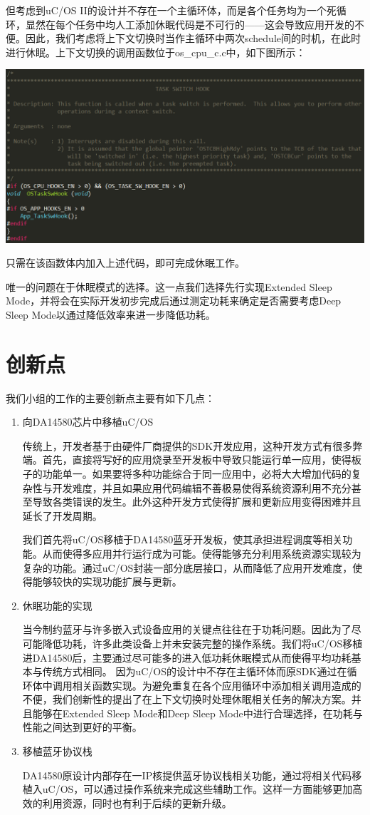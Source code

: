 \documentclass{ctexart}
\begin{document}
但考虑到uC/OS II的设计并不存在一个主循环体，而是各个任务均为一个死循环，显然在每个任务中均人工添加休眠代码是不可行的——这会导致应用开发的不便。因此，我们考虑将上下文切换时当作主循环中两次schedule间的时机，在此时进行休眠。上下文切换的调用函数位于os\_cpu\_c.c中，如下图所示：

\centerline{\includegraphics[scale=0.45]{016}}\par
只需在该函数体内加入上述代码，即可完成休眠工作。

唯一的问题在于休眠模式的选择。这一点我们选择先行实现Extended Sleep Mode，并将会在实际开发初步完成后通过测定功耗来确定是否需要考虑Deep Sleep Mode以通过降低效率来进一步降低功耗。
\section{创新点}
我们小组的工作的主要创新点主要有如下几点：
\begin{enumerate}
\item 向DA14580芯片中移植uC/OS

传统上，开发者基于由硬件厂商提供的SDK开发应用，这种开发方式有很多弊端。首先，直接将写好的应用烧录至开发板中导致只能运行单一应用，使得板子的功能单一。如果要将多种功能综合于同一应用中，必将大大增加代码的复杂性与开发难度，并且如果应用代码编辑不善极易使得系统资源利用不充分甚至导致各类错误的发生。此外这种开发方式使得扩展和更新应用变得困难并且延长了开发周期。

我们首先将uC/OS移植于DA14580蓝牙开发板，使其承担进程调度等相关功能。从而使得多应用并行运行成为可能。使得能够充分利用系统资源实现较为复杂的功能。通过uC/OS封装一部分底层接口，从而降低了应用开发难度，使得能够较快的实现功能扩展与更新。
\item 休眠功能的实现

当今制约蓝牙与许多嵌入式设备应用的关键点往往在于功耗问题。因此为了尽可能降低功耗，许多此类设备上并未安装完整的操作系统。我们将uC/OS移植进DA14580后，主要通过尽可能多的进入低功耗休眠模式从而使得平均功耗基本与传统方式相同。
因为uC/OS的设计中不存在主循环体而原SDK通过在循环体中调用相关函数实现。为避免重复在各个应用循环中添加相关调用造成的不便，我们创新性的提出了在上下文切换时处理休眠相关任务的解决方案。并且能够在Extended Sleep Mode和Deep Sleep Mode中进行合理选择，在功耗与性能之间达到更好的平衡。
\item 移植蓝牙协议栈

DA14580原设计内部存在一IP核提供蓝牙协议栈相关功能，通过将相关代码移植入uC/OS，可以通过操作系统来完成这些辅助工作。这样一方面能够更加高效的利用资源，同时也有利于后续的更新升级。
\end{enumerate}



\end{document}

